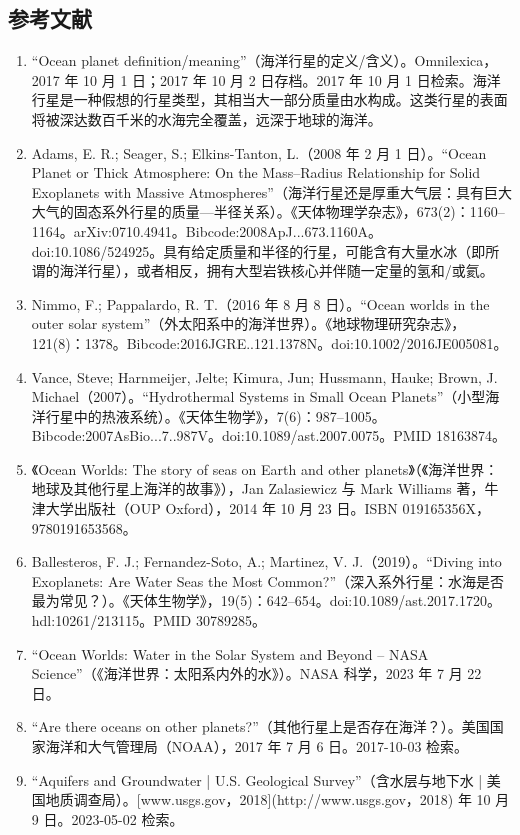 \subsection{参考文献}
\begin{enumerate}
\item “Ocean planet definition/meaning”（海洋行星的定义/含义）。Omnilexica，2017 年 10 月 1 日；2017 年 10 月 2 日存档。2017 年 10 月 1 日检索。海洋行星是一种假想的行星类型，其相当大一部分质量由水构成。这类行星的表面将被深达数百千米的水海完全覆盖，远深于地球的海洋。
\item Adams, E. R.; Seager, S.; Elkins-Tanton, L.（2008 年 2 月 1 日）。“Ocean Planet or Thick Atmosphere: On the Mass–Radius Relationship for Solid Exoplanets with Massive Atmospheres”（海洋行星还是厚重大气层：具有巨大大气的固态系外行星的质量—半径关系）。《天体物理学杂志》，673(2)：1160–1164。arXiv:0710.4941。Bibcode:2008ApJ...673.1160A。doi:10.1086/524925。具有给定质量和半径的行星，可能含有大量水冰（即所谓的海洋行星），或者相反，拥有大型岩铁核心并伴随一定量的氢和/或氦。
\item Nimmo, F.; Pappalardo, R. T.（2016 年 8 月 8 日）。“Ocean worlds in the outer solar system”（外太阳系中的海洋世界）。《地球物理研究杂志》，121(8)：1378。Bibcode:2016JGRE..121.1378N。doi:10.1002/2016JE005081。
\item Vance, Steve; Harnmeijer, Jelte; Kimura, Jun; Hussmann, Hauke; Brown, J. Michael（2007）。“Hydrothermal Systems in Small Ocean Planets”（小型海洋行星中的热液系统）。《天体生物学》，7(6)：987–1005。Bibcode:2007AsBio...7..987V。doi:10.1089/ast.2007.0075。PMID 18163874。
\item 《Ocean Worlds: The story of seas on Earth and other planets》（《海洋世界：地球及其他行星上海洋的故事》），Jan Zalasiewicz 与 Mark Williams 著，牛津大学出版社（OUP Oxford），2014 年 10 月 23 日。ISBN 019165356X，9780191653568。
\item Ballesteros, F. J.; Fernandez-Soto, A.; Martinez, V. J.（2019）。“Diving into Exoplanets: Are Water Seas the Most Common?”（深入系外行星：水海是否最为常见？）。《天体生物学》，19(5)：642–654。doi:10.1089/ast.2017.1720。hdl:10261/213115。PMID 30789285。
\item “Ocean Worlds: Water in the Solar System and Beyond – NASA Science”（《海洋世界：太阳系内外的水》）。NASA 科学，2023 年 7 月 22 日。
\item “Are there oceans on other planets?”（其他行星上是否存在海洋？）。美国国家海洋和大气管理局（NOAA），2017 年 7 月 6 日。2017-10-03 检索。
\item “Aquifers and Groundwater | U.S. Geological Survey”（含水层与地下水 | 美国地质调查局）。[www.usgs.gov，2018](http://www.usgs.gov，2018) 年 10 月 9 日。2023-05-02 检索。

\end{enumerate}
